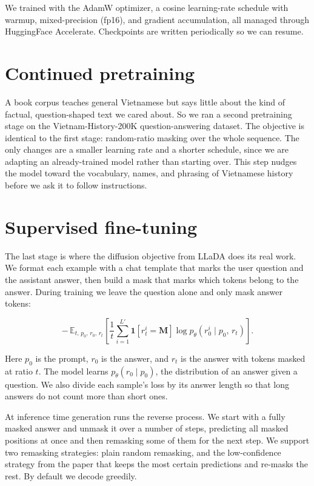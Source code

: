 \documentclass{llncs}
\begin{document}
We trained with the AdamW optimizer, a cosine learning-rate schedule with warmup, mixed-precision
(fp16), and gradient accumulation, all managed through HuggingFace Accelerate. Checkpoints are
written periodically so we can resume.

\section{Continued pretraining}

A book corpus teaches general Vietnamese but says little about the kind of factual,
question-shaped text we cared about. So we ran a second pretraining stage on the
Vietnam-History-200K question-answering dataset. The objective is identical to the first stage:
random-ratio masking over the whole sequence. The only changes are a smaller learning rate and a
shorter schedule, since we are adapting an already-trained model rather than starting over. This
step nudges the model toward the vocabulary, names, and phrasing of Vietnamese history before we
ask it to follow instructions.

\section{Supervised fine-tuning}

The last stage is where the diffusion objective from LLaDA does its real work. We format each
example with a chat template that marks the user question and the assistant answer, then build a
mask that marks which tokens belong to the answer. During training we leave the question alone and
only mask answer tokens:

\begin{equation}
-\,\mathbb{E}_{t,\,p_0,\,r_0,\,r_t}
\left[ \frac{1}{t} \sum_{i=1}^{L'} \mathbf{1}\!\left[r_t^i = \mathbf{M}\right]
\log p_\theta\!\left(r_0^i \mid p_0,\, r_t\right) \right].
\end{equation}

Here $p_0$ is the prompt, $r_0$ is the answer, and $r_t$ is the answer with tokens masked at ratio
$t$. The model learns $p_\theta(r_0 \mid p_0)$, the distribution of an answer given a question. We
also divide each sample's loss by its answer length so that long answers do not count more than
short ones.

At inference time generation runs the reverse process. We start with a fully masked answer and
unmask it over a number of steps, predicting all masked positions at once and then remasking some
of them for the next step. We support two remasking strategies: plain random remasking, and the
low-confidence strategy from the paper that keeps the most certain predictions and re-masks the
rest. By default we decode greedily.
\end{document}
